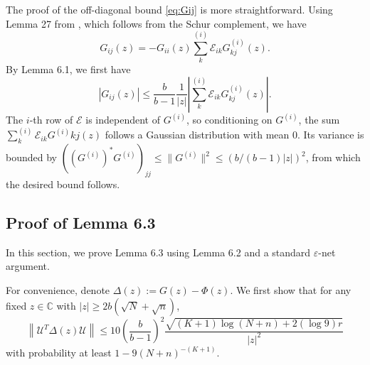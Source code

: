 \documentclass[reqno]{amsart}
\theoremstyle{plain}
\theoremstyle{definition}
\begin{document}
The proof of the off-diagonal bound \eqref{eq:Gij} is more straightforward. Using Lemma 27 from \cite{OVW22}, which follows from the Schur complement, we have 
\[ G_{ij}(z) = - G_{ii}(z) \sum_k^{(i)} \mathcal E_{ik} G^{(i)}_{kj}(z). \]
By Lemma 6.1, we first have 
\[ |G_{ij}(z)| \le \frac{b}{b-1}\frac{1}{|z|}\left|\sum_k^{(i)} \mathcal E_{ik} G^{(i)}_{kj}(z) \right|.\]
The $i$-th row of $\mathcal E$ is independent of $G^{(i)}$, so conditioning on $G^{(i)}$, the sum $\sum_k^{(i)} \mathcal E_{ik} G^{(i)}{kj}(z)$ follows a Gaussian distribution with mean 0. Its variance is bounded by $((G^{(i)})^\ast G^{(i)} )_{jj} \leq \|G^{(i)} \|^2 \le (b/(b-1)|z|)^2$, from which the desired bound follows.

\subsection{Proof of Lemma 6.3}\label{app:lem:betterbd}
In this section, we prove Lemma 6.3 using Lemma 6.2 and a standard $\varepsilon$-net argument. 

For convenience, denote $\Delta(z):=G(z)-\Phi(z)$.  
We first show that for any fixed $z\in \mathbb C$ with $|z| \ge 2b(\sqrt N + \sqrt n)$, 
\[ \left\| \mathcal U^T \Delta(z) \mathcal U  \right\| \leq 10\left(\frac{b}{b-1} \right)^2 \frac{\sqrt{(K+1)\log (N+n)+2(\log 9) r}}{|z|^2}\]
with probability at least $1-9(N+n)^{-(K+1)}$.
\end{document}
